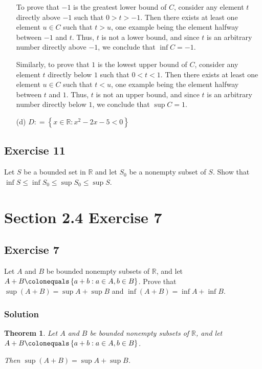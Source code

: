 \documentclass[12pt]{article}
\newtheorem*{thm}{Theorem}
\begin{document}
\begin{itemize}
To prove that $-1$ is the greatest lower bound of $C$, consider any element $t$ directly above $-1$ such that $0 > t > -1$. Then there exists at least one element $u \in C$ such that $t > u$, one example being the element halfway between $-1$ and $t$. Thus, $t$ is not a lower bound, and since $t$ is an arbitrary number directly above $-1$, we conclude that $\inf C = -1$.

Similarly, to prove that $1$ is the lowest upper bound of $C$, consider any element $t$ directly below $1$ such that $0 < t < 1$. Then there exists at least one element $u \in C$ such that $t < u$, one example being the element halfway between $t$ and $1$. Thus, $t$ is not an upper bound, and since $t$ is an arbitrary number directly below $1$, we conclude that $\sup C = 1$.
\item[(d)]$D \mathrel{\mathop:}= \left\{x \in \mathbb{R} : x^2 - 2x - 5 < 0\right\}$
\end{itemize}
\subsection*{Exercise 11}
Let $S$ be a bounded set in $\mathbb{R}$ and let $S_0$ be a nonempty subset of $S$. Show that $\inf S \leq \inf S_0 \leq \sup S_0 \leq \sup S$.

\section*{Section 2.4 Exercise 7}

\subsection*{Exercise 7}

Let $A$ and $B$ be bounded nonempty subsets of $\mathbb{R}$, and let $A + B \colonequals \left\{a + b : a \in A, b \in B\right\}$. Prove that $\sup\left(A + B\right) = \sup A + \sup B$ and $\inf \left(A + B\right) = \inf A + \inf B$.

\subsubsection*{Solution}
\begin{thm}
Let $A$ and $B$ be bounded nonempty subsets of $\mathbb{R}$, and let $A + B \colonequals \left\{a + b : a \in A, b \in B\right\}$.

Then $\sup\left(A + B\right) = \sup A + \sup B$.
\end{thm}
\end{document}
